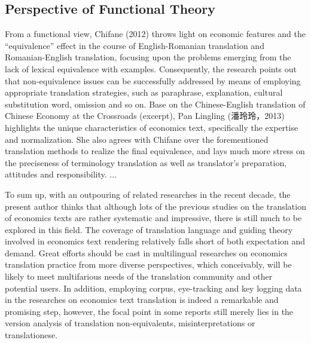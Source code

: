 	\subsection{Perspective of Functional Theory}
	From a functional view, Chifane (2012) throws light on economic features and the “equivalence” effect in the course of English-Romanian translation and Romanian-English translation, focusing upon the problems emerging from the lack of lexical equivalence with examples. Consequently, the research points out that non-equivalence issues can be successfully addressed by means of employing appropriate translation strategies, such as paraphrase, explanation, cultural substitution word, omission and so on. Base on the Chinese-English translation of Chinese Economy at the Crossroads (excerpt), Pan Lingling (潘玲玲，2013) highlights the unique characteristics of economics text, specifically the expertise and normalization. She also agrees with Chifane over the forementioned translation methods to realize the final equivalence, and lays much more stress on the preciseness of terminology translation as well as translator’s preparation, attitudes and responsibility.
	...
	
	To sum up, with an outpouring of related researches in the recent decade, the present author thinks that although lots of the previous studies on the translation of economics texts are rather systematic and impressive, there is still much to be explored in this field. The coverage of translation language and guiding theory involved in economics text rendering relatively falls short of both expectation and demand. Great efforts should be cast in multilingual researches on economics translation practice from more diverse perspectives, which conceivably, will be likely to meet multifarious needs of the translation community and other potential users. In addition, employing corpus, eye-tracking and key logging data in the researches on economics text translation is indeed a remarkable and promising step, however, the focal point in some reports still merely lies in the version analysis of translation non-equivalents, misinterpretations or translationese.